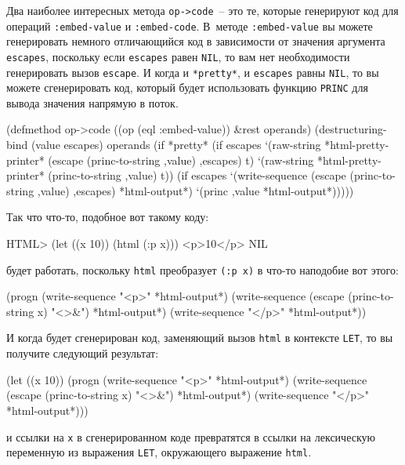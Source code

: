 Два наиболее интересных метода \lstinline{op->code}~-- это те, которые генерируют код для
операций \lstinline{:embed-value} и \lstinline{:embed-code}.  В~методе \lstinline{:embed-value} вы
можете генерировать немного отличающийся код в зависимости от значения аргумента
\lstinline{escapes}, поскольку если \lstinline{escapes} равен \lstinline{NIL}, то вам нет необходимости
генерировать вызов \lstinline{escape}.  И когда и \lstinline{*pretty*}, и \lstinline{escapes} равны
\lstinline{NIL}, то вы можете сгенерировать код, который будет использовать функцию
\lstinline{PRINC} для вывода значения напрямую в поток.

\begin{myverb}
(defmethod op->code ((op (eql :embed-value)) &rest operands)
  (destructuring-bind (value escapes) operands
    (if *pretty*
      (if escapes
        `(raw-string *html-pretty-printer* (escape (princ-to-string ,value) ,escapes) t)
        `(raw-string *html-pretty-printer* (princ-to-string ,value) t))
      (if escapes
        `(write-sequence (escape (princ-to-string ,value) ,escapes) *html-output*)
        `(princ ,value *html-output*)))))
\end{myverb}

Так что что-то, подобное вот такому коду:

\begin{myverb}
HTML> (let ((x 10)) (html (:p x)))
<p>10</p>
NIL
\end{myverb}

\noindent{}будет работать, поскольку \lstinline{html} преобразует \lstinline{(:p x)} в
что-то наподобие вот этого:

\begin{myverb}
(progn
  (write-sequence "<p>" *html-output*)
  (write-sequence (escape (princ-to-string x) "<>&") *html-output*)
  (write-sequence "</p>" *html-output*))
\end{myverb}

И когда будет сгенерирован код, заменяющий вызов \lstinline{html} в контексте
\lstinline{LET}, то вы получите следующий результат:

\begin{myverb}
(let ((x 10))
  (progn
    (write-sequence "<p>" *html-output*)
    (write-sequence (escape (princ-to-string x) "<>&") *html-output*)
    (write-sequence "</p>" *html-output*)))
\end{myverb}

\noindent{}и ссылки на \lstinline{x} в сгенерированном коде превратятся в ссылки на лексическую переменную
из выражения \lstinline{LET}, окружающего выражение \lstinline{html}.

